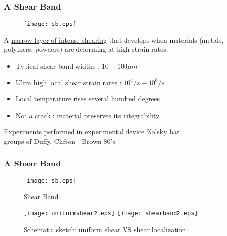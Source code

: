 \documentclass{beamer}
\begin{document}
\begin{frame}
\frametitle{A Shear Band}

  \begin{figure}
    \centering\texttt{[image: sb.eps]}
  \end{figure}



A \underline{narrow layer of intense shearing} that develops when materials (metals, polymers, powders) are deforming at high strain rates.

{\scriptsize
\begin{itemize}
\item Typical shear band widths : $10-100 \mu m$
\item Ultra high local shear strain rates : $10^4/s - 10^6/s$
\item Local temperature rises several hundred degrees
\item Not a crack : material preserves its integrability
\end{itemize}
}

\vspace{0.2cm}
{\footnotesize
Experiments performed in experimental device Kolsky bar \\
\hfill {\footnotesize \color{red} groups of Duffy, Clifton - Brown 80's }
}
\end{frame}



\begin{frame}
 \frametitle{A Shear Band}
 \begin{minipage}{0.3\linewidth}
 \begin{figure}
    \centering
    {
      \texttt{[image: sb.eps]} 
    } 
    \caption{Shear Band}
 \end{figure}
 \end{minipage}
  \hfill
 \begin{minipage}{0.6\linewidth}
 \begin{figure}
      \texttt{[image: uniformshear2.eps]}
     \quad \quad \quad
      \texttt{[image: shearband2.eps]}
    \caption{Schematic sketch: uniform shear VS shear localization}
 \end{figure}
 \end{minipage}
 
\end{frame}
\end{document}
